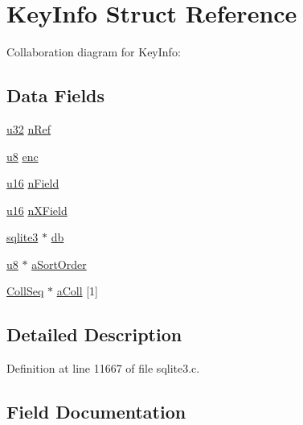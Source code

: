 \hypertarget{struct_key_info}{}\section{Key\+Info Struct Reference}
\label{struct_key_info}


Collaboration diagram for Key\+Info\+:
\subsection*{Data Fields}
\begin{DoxyCompactItemize}
\item 
\hyperlink{sqlite3_8c_a03ad5adfaeb9b7640dde78a0cc390319}{u32} \hyperlink{struct_key_info_a14b3d86e39fd6defd2977d70acb45fd7}{n\+Ref}
\item 
\hyperlink{sqlite3_8c_a74a0f6424ae628af25f23f0a35f6ead3}{u8} \hyperlink{struct_key_info_a9c71ab1f0d39a2b088a6d8a1093159c0}{enc}
\item 
\hyperlink{sqlite3_8c_a20f2299e322dcbde37cb07b16910b843}{u16} \hyperlink{struct_key_info_a51c97c897154719f621dbc598c86cda5}{n\+Field}
\item 
\hyperlink{sqlite3_8c_a20f2299e322dcbde37cb07b16910b843}{u16} \hyperlink{struct_key_info_a0cafa421d471a79f5d796d338488ee54}{n\+X\+Field}
\item 
\hyperlink{structsqlite3}{sqlite3} $\ast$ \hyperlink{struct_key_info_ad6e663497d2c934364b3bcf07496b30b}{db}
\item 
\hyperlink{sqlite3_8c_a74a0f6424ae628af25f23f0a35f6ead3}{u8} $\ast$ \hyperlink{struct_key_info_ace4725075c963b97eb9a9a0db1be905b}{a\+Sort\+Order}
\item 
\hyperlink{struct_coll_seq}{Coll\+Seq} $\ast$ \hyperlink{struct_key_info_affa63783cac77f4126820ca112c63c2f}{a\+Coll} \mbox{[}1\mbox{]}
\end{DoxyCompactItemize}


\subsection{Detailed Description}


Definition at line 11667 of file sqlite3.\+c.



\subsection{Field Documentation}
\hypertarget{struct_key_info_affa63783cac77f4126820ca112c63c2f}{}
